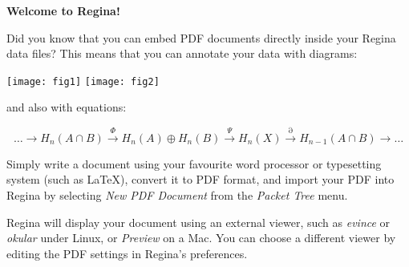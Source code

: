 \documentclass[a4paper,10pt]{article}
\begin{document}
\thispagestyle{empty}
\centerline{\large \bf{Welcome to Regina!}}

\bigskip

Did you know that you can embed PDF documents directly inside your
Regina data files?
This means that you can annotate your data with diagrams:

\bigskip

\centerline{
    \texttt{[image: fig1]}\qquad\qquad
    \texttt{[image: fig2]}}

\medskip

\noindent
and also with equations:

\[ \ldots
    \longrightarrow H_n(A \cap B)
    \stackrel{\Phi}{\longrightarrow} H_n(A) \oplus H_n(B)
    \stackrel{\Psi}{\longrightarrow} H_n(X)
    \stackrel{\partial}{\longrightarrow} H_{n-1}(A \cap B)
    \longrightarrow \ldots
\]

Simply write a document using your favourite word processor or
typesetting system (such as \LaTeX), convert it to PDF format, and import
your PDF into Regina by selecting \emph{New PDF Document} from the
\emph{Packet Tree} menu.

Regina will display your document using an external viewer, such as
\emph{evince} or \emph{okular} under Linux, or \emph{Preview} on a Mac.
You can choose a different viewer by editing the PDF settings
in Regina's preferences.
\end{document}
